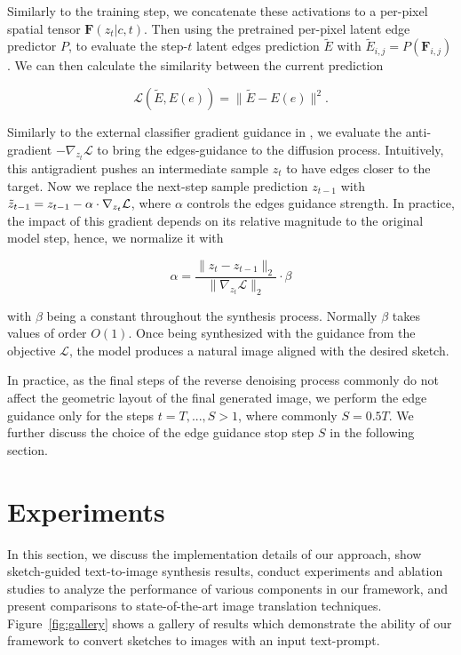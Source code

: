 Similarly to the training step, we concatenate these activations to a per-pixel spatial tensor $\mathbf{F}(z_t | c, t)$. Then using the pretrained per-pixel latent edge predictor $P$, to evaluate the step-$t$ latent edges prediction $\tilde{E}$ with $\tilde{E}_{i, j} = P(\mathbf{F}_{i, j})$. We can then calculate the similarity between the current prediction

\begin{equation}
\mathcal{L}(\tilde{E},E(e)) = \|\tilde{E}-E(e)\|^2.
\end{equation}

Similarly to the external classifier gradient guidance in \cite{dhariwal2021diffusion}, we evaluate the anti-gradient $-\nabla_{z_t}\mathcal{L}$ to bring the edges-guidance to the diffusion process. Intuitively, this antigradient pushes an intermediate sample $z_t$ to have edges closer to the target. Now we replace the next-step sample prediction $z_{t - 1}$ with $\Tilde{z}_{t-1} = z_{t-1} - \alpha \cdot \nabla_{z_t}\mathcal{L}$, where $\alpha$ controls the edges guidance strength. In practice, the impact of this gradient depends on its relative magnitude to the original model step, hence, we normalize it with

\begin{equation}
\alpha = \frac{\|z_t - z_{t - 1}\|_2}{\|\nabla_{z_t}\mathcal{L}\|_2} \cdot \beta
\end{equation}

with $\beta$ being a constant throughout the synthesis process. Normally $\beta$ takes values of order $O(1)$. Once being synthesized with the guidance from the objective $\mathcal{L}$, the model produces a natural image aligned with the desired sketch.

In practice, as the final steps of the reverse denoising process commonly do not affect the geometric layout of the final generated image, we perform the edge guidance only for the steps $t = T, ..., S > 1$, where commonly $S = 0.5 T$. We further discuss the choice of the edge guidance stop step $S$ in the following section.

\section{Experiments}
\label{sec:exp}

In this section, we discuss the implementation details of our approach, show sketch-guided text-to-image synthesis results, conduct experiments and ablation studies to analyze the performance of various components in our framework, and present comparisons to state-of-the-art image translation techniques. Figure~\ref{fig:gallery} shows a gallery of results which demonstrate the ability of our framework to convert sketches to images with an input text-prompt. 

